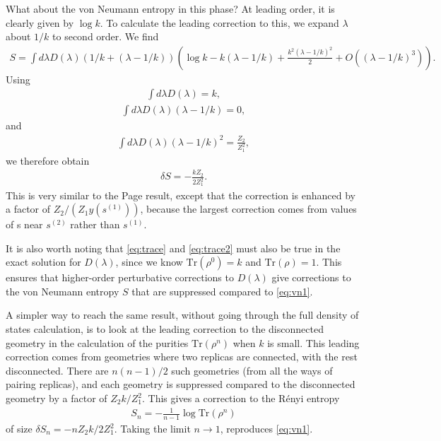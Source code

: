 \documentclass[12pt]{article}
\numberwithin{equation}{section}
\begin{document}
What about the von Neumann entropy in this phase? At leading order, it is clearly given by $\log k$. To calculate the leading correction to this, we expand $\lambda$ about $1/k$ to second order. We find
\begin{align} \label{eq:vonNeumannsemicircle}
S = \int d \lambda D(\lambda) (1/k + (\lambda - 1/k)) \left( \log k - k (\lambda - 1/k)  + \frac{k^2 (\lambda - 1/k)^2}{2} + O((\lambda - 1/k)^3)\right).
\end{align}
Using
\begin{align} \label{eq:trace}
\int d \lambda D(\lambda) = k,
\end{align}
\begin{align} \label{eq:trace2}
\int d \lambda D(\lambda) (\lambda  - 1/k)= 0,
\end{align}
and
\begin{align} \label{eq:2ndmoment}
\int d \lambda D(\lambda) (\lambda -1/k)^2 = \frac{Z_2 }{ Z_1^2},
\end{align}
we therefore obtain
\begin{align} \label{eq:vn1}
\delta S = - \frac{k Z_2}{2 Z_1^2}.
\end{align}
This is very similar to the Page result, except that the correction is enhanced by a factor of $Z_2 / (Z_1 y(s^{(1)}))$, because the largest correction comes from values of s near $s^{(2)}$ rather than $s^{(1)}$. 

It is also worth noting that \eqref{eq:trace} and \eqref{eq:trace2} must also be true in the exact solution for $D(\lambda)$, since we know $\mathrm{Tr}(\rho^0) = k$ and  $\mathrm{Tr}(\rho) = 1$. This ensures that higher-order perturbative corrections to $D(\lambda)$ give corrections to the von Neumann entropy $S$ that are suppressed compared to \eqref{eq:vn1}.

A simpler way to reach the same result, without going through the full density of states calculation, is to look at the leading correction to the disconnected geometry in the calculation of the purities $\mathrm{Tr}(\rho^n)$ when $k$ is small. This leading correction comes from geometries where two replicas are connected, with the rest disconnected. There are $n(n-1)/2$ such geometries (from all the ways of pairing replicas), and each geometry is suppressed compared to the disconnected geometry by a factor of $Z_2 k / Z_1^2$. This gives a correction to the R\'{e}nyi entropy 
\begin{align}
S_n = -\frac{1}{n-1} \log \mathrm{Tr}(\rho^n)
\end{align}
of size $\delta S_n = -n Z_2 k / 2 Z_1^2$. Taking the limit $n \to 1$, reproduces \eqref{eq:vn1}.
\end{document}
